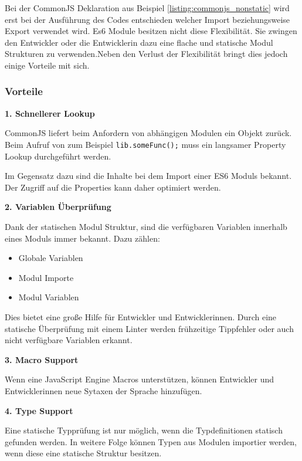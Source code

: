 Bei der CommonJS Deklaration aus Beispiel \ref{listing:commonjs_nonstatic} wird erst bei der Ausführung des Codes entschieden welcher Import beziehungsweise Export verwendet wird. Es6 Module besitzen nicht diese Flexibilität. Sie zwingen den Entwickler oder die Entwicklerin dazu eine flache und statische Modul Strukturen zu verwenden.Neben den Verlust der Flexibilität bringt dies jedoch einige Vorteile mit sich. \autocite{Rauschmayer2014}

\subsubsection{Vorteile}

\textbf{1. Schnellerer Lookup}

CommonJS liefert beim Anfordern von abhängigen Modulen ein Objekt zurück. Beim Aufruf von zum Beispiel \lstinline{lib.someFunc();} muss ein langsamer Property Lookup durchgeführt werden.

Im Gegensatz dazu sind die Inhalte bei dem Import einer ES6 Moduls bekannt. Der Zugriff auf die Properties kann daher optimiert werden. \autocite{Rauschmayer2014}

\bigskip

\textbf{2. Variablen Überprüfung}

Dank der statischen Modul Struktur, sind die verfügbaren Variablen innerhalb eines Moduls immer bekannt. Dazu zählen:
\begin{itemize}
\item Globale Variablen
\item Modul Importe
\item Modul Variablen
\end{itemize}
Dies bietet eine große Hilfe für Entwickler und Entwicklerinnen. Durch eine statische Überprüfung mit einem Linter werden frühzeitige Tippfehler oder auch nicht verfügbare Variablen erkannt.\autocite{Rauschmayer2014}

\bigskip

\textbf{3. Macro Support}

Wenn eine JavaScript Engine Macros unterstützen, können Entwickler und Entwicklerinnen neue Sytaxen der Sprache hinzufügen.

\bigskip

\textbf{4. Type Support}

Eine statische Typprüfung ist nur möglich, wenn die Typdefinitionen statisch gefunden werden. In weitere Folge können Typen aus Modulen importier werden, wenn diese eine statische Struktur besitzen.

